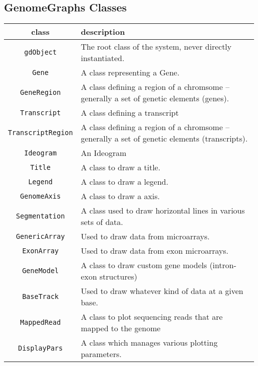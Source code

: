 \documentclass[11pt]{article}
\begin{document}
\subsection{GenomeGraphs Classes}
\begin{table}[bp!]
    \begin{center}
      \begin{tabular}{@{}cp{8cm}@{}}
        \hline
        class & description \\
        \hline
        \texttt{gdObject} &  The root class of the system, never directly
        instantiated. \\
        \texttt{Gene} &  A class representing a Gene. \\
        \texttt{GeneRegion} & A class defining a region of a chromsome
        -- generally a set of genetic elements (genes). \\
        \texttt{Transcript} & A class defining a transcript \\
        \texttt{TranscriptRegion} &  A class defining a region of a chromsome --
        generally a set of genetic elements (transcripts).\\
        \texttt{Ideogram} &  An Ideogram \\
        \texttt{Title} &  A class to draw a title. \\
        \texttt{Legend} &  A class to draw a legend.\\
        \texttt{GenomeAxis} &  A class to draw a axis.\\
        \texttt{Segmentation} &  A class used to draw horizontal lines in various
        sets of data. \\
        \texttt{GenericArray} &  Used to draw data from microarrays. \\
        \texttt{ExonArray} &  Used to draw data from exon microarrays. \\
        \texttt{GeneModel} & A class to draw custom gene models (intron-exon structures)  \\
        \texttt{BaseTrack} &  Used to draw whatever kind of data at a given
        base. \\
        \texttt{MappedRead} &  A class to plot sequencing reads that are mapped to the genome\\
        \texttt{DisplayPars} & A class which manages various plotting parameters. \\
        \hline
      \end{tabular}
    \end{center}
  \end{table}
\end{document}
